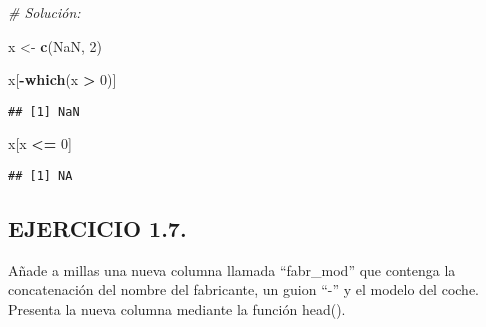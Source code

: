 \documentclass[]{article}
\newenvironment{Shaded}{\begin{snugshade}}{\end{snugshade}}
\newcommand{\CommentTok}[1]{\textcolor[rgb]{0.56,0.35,0.01}{\textit{#1}}}
\newcommand{\DecValTok}[1]{\textcolor[rgb]{0.00,0.00,0.81}{#1}}
\newcommand{\KeywordTok}[1]{\textcolor[rgb]{0.13,0.29,0.53}{\textbf{#1}}}
\newcommand{\NormalTok}[1]{#1}
\newcommand{\OperatorTok}[1]{\textcolor[rgb]{0.81,0.36,0.00}{\textbf{#1}}}
\newcommand{\OtherTok}[1]{\textcolor[rgb]{0.56,0.35,0.01}{#1}}
\newcommand{\StringTok}[1]{\textcolor[rgb]{0.31,0.60,0.02}{#1}}
\begin{document}
\begin{Shaded}
\begin{Highlighting}[]
\CommentTok{# Solución:}

\NormalTok{x <-}\StringTok{ }\KeywordTok{c}\NormalTok{(}\OtherTok{NaN}\NormalTok{, }\DecValTok{2}\NormalTok{)}

\NormalTok{x[}\OperatorTok{-}\KeywordTok{which}\NormalTok{(x }\OperatorTok{>}\StringTok{ }\DecValTok{0}\NormalTok{)]}
\end{Highlighting}
\end{Shaded}

\begin{verbatim}
## [1] NaN
\end{verbatim}

\begin{Shaded}
\begin{Highlighting}[]
\NormalTok{x[x }\OperatorTok{<=}\StringTok{ }\DecValTok{0}\NormalTok{]}
\end{Highlighting}
\end{Shaded}

\begin{verbatim}
## [1] NA
\end{verbatim}

\hypertarget{ejercicio-1.7.}{%
\subsection{EJERCICIO 1.7.}\label{ejercicio-1.7.}}

Añade a millas una nueva columna llamada ``fabr\_mod'' que contenga la
concatenación del nombre del fabricante, un guion ``-'' y el modelo del
coche. Presenta la nueva columna mediante la función head().

\begin{Shaded}
\end{Shaded}
\end{document}

